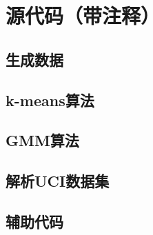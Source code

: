 \documentclass[lang=cn,11pt,a4paper,cite=authoryear]{elegantpaper}
\begin{document}
\nocite{*}

\appendix
\addappheadtotoc
\section{源代码（带注释）}
\subsection{生成数据}




\subsection{k-means算法}




\subsection{GMM算法}




\subsection{解析UCI数据集}




\subsection{辅助代码}


\end{document}
